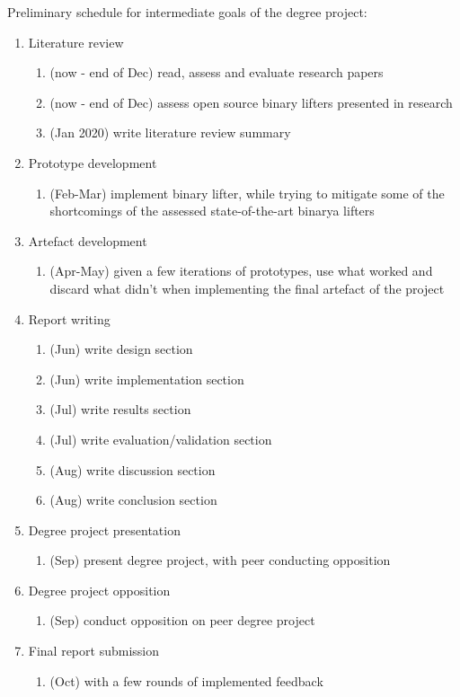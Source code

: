 \documentclass[12pt, a4paper]{article}
\begin{document}
Preliminary schedule for intermediate goals of the degree project:

\begin{enumerate}
	\item Literature review
	\begin{enumerate}
		\item (now - end of Dec) read, assess and evaluate research papers
		\item (now - end of Dec) assess open source binary lifters presented in research
		\item (Jan 2020) write literature review summary
	\end{enumerate}
	\item Prototype development
	\begin{enumerate}
		\item (Feb-Mar) implement binary lifter, while trying to mitigate some of the shortcomings of the assessed state-of-the-art binarya lifters
	\end{enumerate}
	\item Artefact development
	\begin{enumerate}
		\item (Apr-May) given a few iterations of prototypes, use what worked and discard what didn't when implementing the final artefact of the project
	\end{enumerate}
	\item Report writing
	\begin{enumerate}
		\item (Jun) write design section
		\item (Jun) write implementation section
		\item (Jul) write results section
		\item (Jul) write evaluation/validation section
		\item (Aug) write discussion section
		\item (Aug) write conclusion section
	\end{enumerate}
	\item Degree project presentation
	\begin{enumerate}
		\item (Sep) present degree project, with peer conducting opposition
	\end{enumerate}
	\item Degree project opposition
	\begin{enumerate}
		\item (Sep) conduct opposition on peer degree project
	\end{enumerate}
	\item Final report submission
	\begin{enumerate}
		\item (Oct) with a few rounds of implemented feedback
	\end{enumerate}
\end{enumerate}
\end{document}
